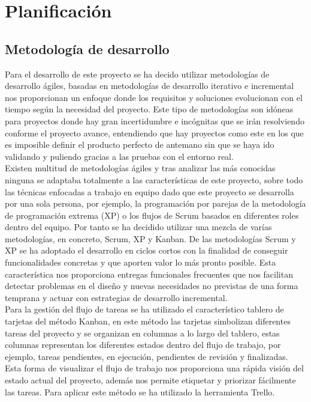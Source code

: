\documentclass[../proyecto.tex]{subfiles}
\begin{document}
\chapter{Planificación}

\section{Metodología de desarrollo}

Para el desarrollo de este proyecto se ha decido utilizar metodologías de desarrollo ágiles, basadas en metodologías de desarrollo iterativo e incremental nos proporcionan un enfoque donde los requisitos y soluciones evolucionan con el tiempo según la necesidad del proyecto. Este tipo de metodologías son idóneas para proyectos donde hay gran incertidumbre e incógnitas que se irán resolviendo conforme el proyecto avance,  entendiendo que hay proyectos como este en los que es imposible definir el producto perfecto de antemano sin que se haya ido validando y puliendo gracias a las pruebas con el entorno real.\\

Existen multitud de metodologías ágiles y tras analizar las más conocidas ninguna se adaptaba totalmente a las características de este proyecto, sobre todo las técnicas enfocadas a trabajo en equipo dado que este proyecto se desarrolla por una sola persona, por ejemplo, la programación por parejas de la metodología de programación extrema (XP) o los flujos de Scrum basados en diferentes roles dentro del equipo. Por tanto se ha decidido utilizar una mezcla de varías metodologías, en concreto, Scrum, XP y Kanban. De las metodologías Scrum y XP se ha adoptado el desarrollo en ciclos cortos con la finalidad de conseguir funcionalidades concretas y que aporten valor lo más pronto posible. Esta característica nos proporciona entregas funcionales frecuentes que nos facilitan detectar problemas en el diseño y nuevas necesidades no previstas de una forma temprana y actuar con estrategias de desarrollo incremental.\\

Para la gestión del flujo de tareas se ha utilizado el característico tablero de tarjetas del método Kanban, en este método las tarjetas simbolizan diferentes tareas del proyecto y se organizan en columnas a lo largo del tablero, estas columnas representan los diferentes estados dentro del flujo de trabajo, por ejemplo, tareas pendientes, en ejecución, pendientes de revisión y finalizadas. Esta forma de visualizar el flujo de trabajo nos proporciona una rápida visión del estado actual del proyecto, además nos permite etiquetar y priorizar fácilmente las tareas. Para aplicar este método se ha utilizado la herramienta Trello.\\
\end{document}
